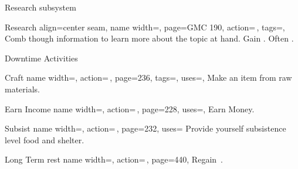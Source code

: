 \begin{PageFront}
\begin{Tables}{\frontTableHeight}
        \TableSpace
        \begin{Table}{Research subsystem}
            \begin{entry}{Research}{%
                align=center seam,
                name width=\activityLength,%
                page=GMC 190,
                action=\,,
                tags=\Concentrate,
            }
                Comb though information to learn more about the topic at hand.
                Gain  .
                Often \Linguistic.\\
            \end{entry}
        \end{Table}
    \end{Tables}%
    \begin{Tables}{\frontTableHeight}
        \begin{Table}{Downtime Activities}
            \begin{entry}{Craft}{%
                name width=\activityLength,%
                action=\,\TimeDaily,
                page=236,
                tags=\Manipulate,
                uses={\Crafting[tags={T}]},
            }
                Make an item from raw materials.\hfill
            \end{entry}
            \begin{entry}{Earn Income}{%
                name width=\activityLength,%
                action=\,\TimeDaily,
                page=228,
                uses={},
            }
                Earn Money.
            \end{entry}
            \begin{entry}{Subsist}{%
                name width=\activityLength,%
                action=\,,
                page=232,
                uses={}
            }
                Provide yourself subsistence level food and shelter.\hfill
            \end{entry}
            \begin{entry}{Long Term rest}{%
                name width=\activityLength,%
                action=\,,
                page=440,
            }
                Regain \,\HPs. \quad

\end{entry}
\end{Table}
\end{Tables}
\end{PageFront}

